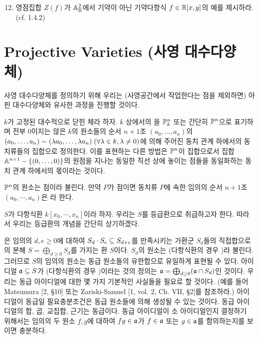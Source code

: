 	\begin{enumerate}[label=\tb{1.\arabic*.},itemindent=0mm,itemsep=2mm,topsep=2mm]
	\setcounter{enumi}{11}
	\item 영점집합 $Z(f)$가 $\mathbb{A}_\mathbb R^2$에서 기약이 아닌 기약다항식 $f\in\mathbb R[x,y]$의 예를 제시하라. (cf. 1.4.2)
	\end{enumerate}
	
	
	
	\section{Projective Varieties (사영 대수다양체)}
	
	사영 대수다양체를 정의하기 위해 우리는 (사영공간에서 작업한다는 점을 제외하면) 아핀 대수다양체와 유사한 과정을 진행할 것이다.
	
	$k$가 고정된 대수적으로 닫힌 체라 하자. $k$ 상에서의 을
	$\mathbb{P}_k^n$ 또는 간단히 $\mathbb{P}^n$으로 표기하며 전부 0이지는 않은 $k$의 원소들의 순서 $n+1$조 $(a_0,\ldots,a_n)$의
	$(a_0,\ldots,a_n)\sim(\lambda a_0,\ldots,\lambda a_n)\;(\forall\lambda\in k,\lambda\ne 0)$에 의해 주어진
	동치 관계 하에서의 동치류들의 집합으로 정의한다.
	이를 표현하는 다른 방법은 $\mathbb{P}^n$이 집합으로서 집합 $\mathbb{A}^{n+1}-\{(0,\ldots,0)\}$의
	원점을 지나는 동일한 직선 상에 놓이는 점들을 동일화하는 동치 관계 하에서의 몫이라는 것이다.
	
	$\mathbb{P}^n$의 원소는 점이라 불린다. 만약 $P$가 점이면 동치류 $P$에 속한 임의의 순서 $n+1$조 $(a_0,\cdots,a_n)$은
	라 한다.
	
	$S$가 다항식환 $k[x_0,\cdots,x_n]$이라 하자. 우리는 $S$를 등급환으로 취급하고자 한다.
	따라서 우리는 등급환의 개념을 간단히 상기하겠다.
	
	은 임의의 $d,e\ge 0$에 대하여 $S_d\cdot S_e\subseteq S_{d+e}$를 만족시키는
	가환군 $S_d$들의 직접합으로의 분해 $S=\bigoplus_{d\ge 0}S_d$를 가지는 환 $S$이다.
	$S_d$의 원소는 (다항식환의 경우 )라 불린다.
	그러므로 $S$의 임의의 원소는 동급 원소들의 유한합으로 유일하게 표현될 수 있다.
	아이디얼 $\mathfrak{a}\subseteq S$가 (다항식환의 경우 )이라는 것의 정의는
	$\mathfrak{a}=\bigoplus_{d\ge 0}(\mathfrak{a}\cap S_d)$인 것이다.
	우리는 동급 아이디얼에 대한 몇 가지 기본적인 사실들을 필요로 할 것이다.
	(예를 들어 Matsumura [2, \S 10] 또는 Zariski-Samuel [1, vol. 2, Ch. VII, \S 2]를 참조하라.)
	아이디얼이 동급일 필요충분조건은 동급 원소들에 의해 생성될 수 있는 것이다.
	동급 아이디얼의 합, 곱, 교집합, 근기는 동급이다. 동급 아이디얼이 소 아이디얼인지 결정하기 위해서는
	임의의 두  원소 $f,g$에 대하여 $fg\in\mathfrak{a}$가 $f\in\mathfrak{a}$ 또는 $g\in\mathfrak{a}$를 함의하는지를 보이면 충분하다.
	
